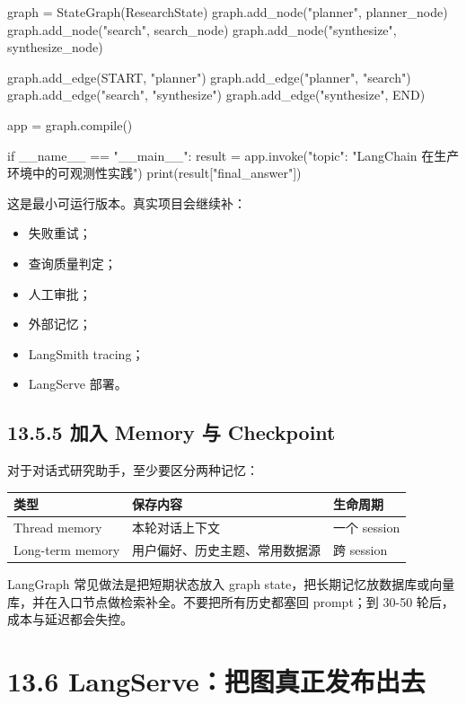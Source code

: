 \begin{codeblock}
graph = StateGraph(ResearchState)
graph.add_node("planner", planner_node)
graph.add_node("search", search_node)
graph.add_node("synthesize", synthesize_node)

graph.add_edge(START, "planner")
graph.add_edge("planner", "search")
graph.add_edge("search", "synthesize")
graph.add_edge("synthesize", END)

app = graph.compile()

if __name__ == "__main__":
    result = app.invoke({"topic": "LangChain 在生产环境中的可观测性实践"})
    print(result["final_answer"])
\end{codeblock}

这是最小可运行版本。真实项目会继续补：


\begin{itemize}[leftmargin=2em]
\item 失败重试；
\item 查询质量判定；
\item 人工审批；
\item 外部记忆；
\item LangSmith tracing；
\item LangServe 部署。
\end{itemize}

\subsection{13.5.5 加入 Memory 与 Checkpoint}

对于对话式研究助手，至少要区分两种记忆：


\begingroup
\scriptsize
\setlength{\tabcolsep}{3pt}
\begin{longtable}{|p{}|p{}|p{}|}
\hline
类型 & 保存内容 & 生命周期 \\ \hline
Thread memory & 本轮对话上下文 & 一个 session \\ \hline
Long-term memory & 用户偏好、历史主题、常用数据源 & 跨 session \\ \hline
\end{longtable}
\endgroup

LangGraph 常见做法是把短期状态放入 graph state，把长期记忆放数据库或向量库，并在入口节点做检索补全。不要把所有历史都塞回 prompt；到 30-50 轮后，成本与延迟都会失控。


\section{13.6 LangServe：把图真正发布出去}

